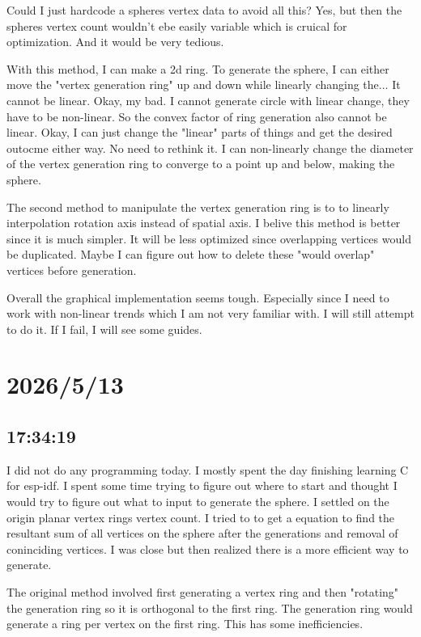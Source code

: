 \documentclass{article}
\begin{document}
Could I just hardcode a spheres vertex data to avoid all this? Yes, but then the spheres vertex count wouldn't
ebe easily variable which is cruical for optimization. And it would be very tedious.

With this method, I can make a 2d ring. To generate the sphere, I can either move the "vertex generation
ring" up and down while linearly changing the... It cannot be linear. Okay, my bad. I cannot generate
circle with linear change, they have to be non-linear. So the convex factor of ring generation also cannot 
be linear. Okay, I can just change the "linear" parts of things and get the desired outocme either way.
No need to rethink it. I can non-linearly change the diameter of the vertex generation ring to converge to
a point up and below, making the sphere.

The second method to manipulate the vertex generation ring is to to linearly interpolation rotation axis 
instead of spatial axis. I belive this method is better since it is much simpler. It will be less optimized
since overlapping vertices would be duplicated. Maybe I can figure out how to delete these "would overlap"
vertices before generation.

Overall the graphical implementation seems tough. Especially since I need to work with non-linear trends
which I am not very familiar with. I will still attempt to do it. If I fail, I will see some guides.

\section*{2026/5/13}
\subsection*{17:34:19}
I did not do any programming today. I mostly spent the day finishing learning C for esp-idf.
I spent some time trying to figure out where to start and thought I would try to figure out what
to input to generate the sphere. I settled on the origin planar vertex rings vertex count. I tried to
to get a equation to find the resultant sum of all vertices on the sphere after the generations and 
removal of coninciding vertices. I was close but then realized there is a more efficient way to generate.

The original method involved first generating a vertex ring and then "rotating" the generation ring so
it is orthogonal to the first ring. The generation ring would generate a ring per vertex on the first
ring. This has some inefficiencies.
\end{document}
